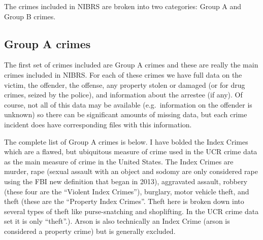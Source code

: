 \documentclass[
]{krantz}
\begin{document}
The crimes included in NIBRS are broken into two categories:
Group A and Group B crimes.

\subsection{Group A crimes}\label{group-a-crimes}

The first set of crimes included are Group A crimes and
these are really the main crimes included in NIBRS. For each
of these crimes we have full data on the victim, the
offender, the offense, any property stolen or damaged (or
for drug crimes, seized by the police), and information
about the arrestee (if any). Of course, not all of this data
may be available (e.g.~information on the offender is
unknown) so there can be significant amounts of missing
data, but each crime incident does have corresponding files
with this information.

The complete list of Group A crimes is below. I have bolded
the Index Crimes which are a flawed, but ubiquitous measure
of crime used in the UCR crime data as the main measure of
crime in the United States. The Index Crimes are murder,
rape (sexual assault with an object and sodomy are only
considered rape using the FBI new definition that began in
2013), aggravated assault, robbery (these four are the
``Violent Index Crimes''), burglary, motor vehicle theft,
and theft (these are the ``Property Index Crimes''. Theft
here is broken down into several types of theft like
purse-snatching and shoplifting. In the UCR crime data set it
is only ``theft''.). Arson is also technically an Index
Crime (arson is considered a property crime) but is
generally excluded.
\end{document}
